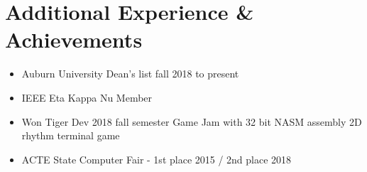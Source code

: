 \documentclass[letterpaper,10pt]{article}
\newcommand{\resumeSubHeadingListStart}{\begin{itemize}[leftmargin=*]}
\newcommand{\resumeSubHeadingListEnd}{\end{itemize}}
\newcommand{\shorterSection}[1]{\vspace{-10pt}\section{#1}}
\begin{document}
	\shorterSection{Additional Experience \& Achievements}
	  \resumeSubHeadingListStart
	  \small
	  	\item{Auburn University Dean's list fall 2018 to present}
	  	\vspace{-5pt}
	  	\item{IEEE Eta Kappa Nu Member }
	  	\vspace{-5pt}
	    \item{Won Tiger Dev 2018 fall semester Game Jam with 32 bit NASM assembly 2D rhythm terminal game}
	    \vspace{-5pt}
	    \item{ACTE State Computer Fair - 1st place 2015 / 2nd place 2018}
	  \resumeSubHeadingListEnd
	
\end{document}
